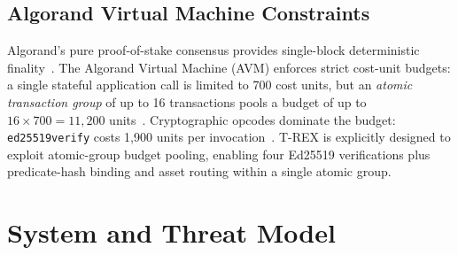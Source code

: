 \documentclass[journal]{IEEEtran}
\begin{document}
\subsection{Algorand Virtual Machine Constraints}
Algorand's pure proof-of-stake consensus provides single-block
deterministic finality~\cite{gilad2017algorand}.
The Algorand Virtual Machine (AVM) enforces strict cost-unit budgets:
a single stateful application call is limited to 700 cost units, but
an \emph{atomic transaction group} of up to 16 transactions pools a
budget of up to $16 \times 700 = 11{,}200$
units~\cite{algorand_costs}.
Cryptographic opcodes dominate the budget: \texttt{ed25519verify}
costs 1{,}900 units per invocation~\cite{algorand_costs}.
T-REX is explicitly designed to exploit atomic-group budget pooling,
enabling four Ed25519 verifications plus predicate-hash binding and
asset routing within a single atomic group.

\begin{table}[t]
\centering
\caption{Comparison of Settlement Protocols for Agentic Commerce}
\label{tab:comparison}
\end{table}

\section{System and Threat Model}
\label{sec:model}
\end{document}
